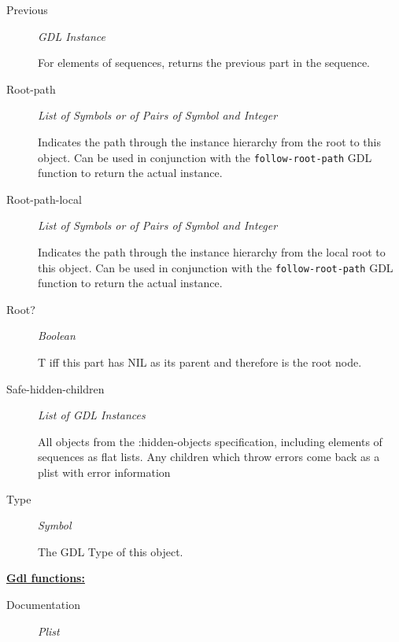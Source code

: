 \documentclass [11pt]{book}
\begin{document}
\begin{itemize}
\begin{description}
\item [Previous]
\emph{GDL Instance}

 For elements of sequences, returns the previous part in the sequence.




\item [Root-path]
\emph{List of Symbols or of Pairs of Symbol and Integer}

 Indicates the path through
the instance hierarchy from the root to this object. Can be used in conjunction with
the \texttt{follow-root-path} GDL function to return the actual instance.




\item [Root-path-local]
\emph{List of Symbols or of Pairs of Symbol and Integer}

 Indicates the path through
the instance hierarchy from the local root to this object. Can be used in conjunction with
the \texttt{follow-root-path} GDL function to return the actual instance.




\item [Root?]
\emph{Boolean}

 T iff this part has NIL as its parent and therefore is the root node.




\item [Safe-hidden-children]
\emph{List of GDL Instances}

 All objects from the :hidden-objects specification, including elements of sequences
as flat lists. Any children which throw errors come back as a plist with error information




\item [Type]
\emph{Symbol}

 The GDL Type of this object.




\end{description}






\textbf{
\underline{Gdl functions:}}

\begin{description}

\item [Documentation]
\emph{Plist}


\end{description}
\end{itemize}
\end{document}
